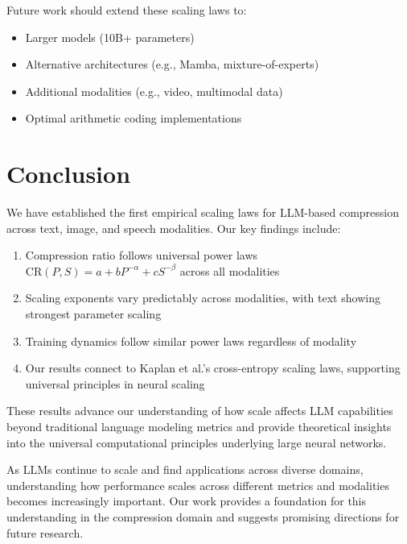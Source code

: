 \documentclass[11pt]{article}
\begin{document}
Future work should extend these scaling laws to:
\begin{itemize}
\item Larger models (10B+ parameters)
\item Alternative architectures (e.g., Mamba, mixture-of-experts)
\item Additional modalities (e.g., video, multimodal data)
\item Optimal arithmetic coding implementations
\end{itemize}

\section{Conclusion}

We have established the first empirical scaling laws for LLM-based compression across text, image, and speech modalities. Our key findings include:

\begin{enumerate}
\item Compression ratio follows universal power laws $\mathrm{CR}(P,S) = a + bP^{-\alpha} + cS^{-\beta}$ across all modalities
\item Scaling exponents vary predictably across modalities, with text showing strongest parameter scaling
\item Training dynamics follow similar power laws regardless of modality
\item Our results connect to Kaplan et al.'s cross-entropy scaling laws, supporting universal principles in neural scaling
\end{enumerate}

These results advance our understanding of how scale affects LLM capabilities beyond traditional language modeling metrics and provide theoretical insights into the universal computational principles underlying large neural networks.

As LLMs continue to scale and find applications across diverse domains, understanding how performance scales across different metrics and modalities becomes increasingly important. Our work provides a foundation for this understanding in the compression domain and suggests promising directions for future research.

\newpage
\end{document}
